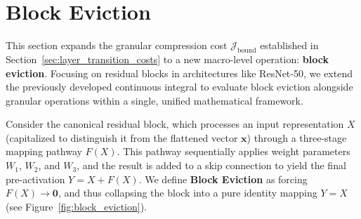 \documentclass[11pt, a4paper, copyright, gdm]{google}
\newcommand{\xVect}{\boldsymbol{x}}
\newcommand{\zeroVect}{\boldsymbol{0}}
\newcommand{\calJ}{\mathcal{J}}
\theoremstyle{definition}
\begin{document}
\section{Block Eviction}
\label{sec:block_eviction}
This section expands the granular compression cost $\calJ_{\text{bound}}$ established in Section~\ref{sec:layer_transition_costs} to a new macro-level operation: \textbf{block eviction}. Focusing on residual blocks in architectures like ResNet-50, we extend the previously developed continuous integral to evaluate block eviction alongside granular operations within a single, unified mathematical framework.

Consider the canonical residual block, which processes an input representation $X$ (capitalized to distinguish it from the flattened vector $\xVect$) through a three-stage mapping pathway $F(X)$. This pathway sequentially applies weight parameters $W_1$, $W_2$, and $W_3$, and the result is added to a skip connection to yield the final pre-activation $Y = X + F(X)$. We define \textbf{Block Eviction} as forcing $F(X) \to \zeroVect$, and thus collapsing the block into a pure identity mapping $Y = X$ (see Figure~\ref{fig:block_eviction}).
\end{document}
